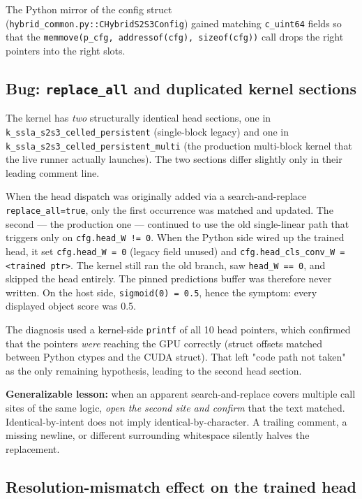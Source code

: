 \documentclass[11pt,a4paper]{article}
\begin{document}
The Python mirror of the config struct
(\texttt{hybrid\_common.py::CHybridS2S3Config}) gained matching
\texttt{c\_uint64} fields so that the \texttt{memmove(p\_cfg,
addressof(cfg), sizeof(cfg))} call drops the right pointers into the
right slots.

\subsection{Bug: \texttt{replace\_all} and duplicated kernel sections}

The kernel has \emph{two} structurally identical head sections, one in
\texttt{k\_ssla\_s2s3\_celled\_persistent} (single-block legacy) and
one in \texttt{k\_ssla\_s2s3\_celled\_persistent\_multi} (the
production multi-block kernel that the live runner actually launches).
The two sections differ slightly only in their leading comment line.

When the head dispatch was originally added via a search-and-replace
\texttt{replace\_all=true}, only the first occurrence was matched and
updated. The second --- the production one --- continued to use the
old single-linear path that triggers only on \texttt{cfg.head\_W != 0}.
When the Python side wired up the trained head, it set
\texttt{cfg.head\_W = 0} (legacy field unused) and
\texttt{cfg.head\_cls\_conv\_W = <trained ptr>}. The kernel still ran
the old branch, saw \texttt{head\_W == 0}, and skipped the head
entirely. The pinned predictions buffer was therefore never written.
On the host side, \texttt{sigmoid(0) = 0.5}, hence the symptom: every
displayed object score was 0.5.

The diagnosis used a kernel-side \texttt{printf} of all 10 head
pointers, which confirmed that the pointers \emph{were} reaching the
GPU correctly (struct offsets matched between Python ctypes and the
CUDA struct). That left "code path not taken" as the only remaining
hypothesis, leading to the second head section.

\textbf{Generalizable lesson:} when an apparent search-and-replace
covers multiple call sites of the same logic, \emph{open the second
site and confirm} that the text matched. Identical-by-intent does not
imply identical-by-character. A trailing comment, a missing newline,
or different surrounding whitespace silently halves the replacement.

\subsection{Resolution-mismatch effect on the trained head}
\end{document}
